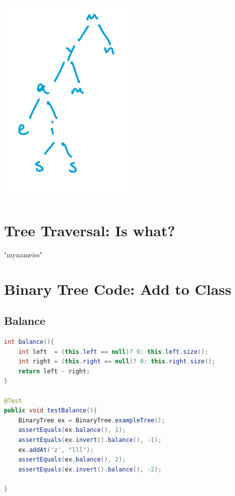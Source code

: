 \documentclass[twoside=false,DIV=14]{scrartcl}
\begin{document}
\includegraphics[width=0.5\textwidth]{mystery_tree_one.jpeg}

\section{Tree Traversal: Is what?}

"mynameiss"

\section{Binary Tree Code: Add to Class}
\subsection{Balance}
\begin{lstlisting}[language=java]
int balance(){
    int left  = (this.left == null)? 0: this.left.size();
    int right = (this.right == null)? 0: this.right.size();
    return left - right;
}

@Test
public void testBalance(){
    BinaryTree ex = BinaryTree.exampleTree();
    assertEquals(ex.balance(), 1);
    assertEquals(ex.invert().balance(), -1);
    ex.addAt('z', "lll");
    assertEquals(ex.balance(), 2);
    assertEquals(ex.invert().balance(), -2);

}
\end{lstlisting}
\end{document}

